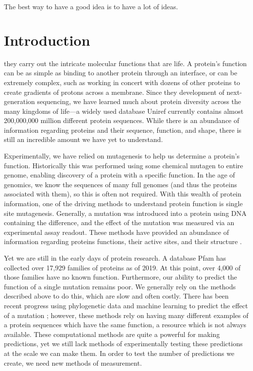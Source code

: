 \begin{savequote}[75mm]
The best way to have a good idea is to have a lot of ideas. 
\end{savequote}

\chapter{Introduction}
\label{introduction}


 they carry out the intricate molecular functions that are life.  A protein's function can be as simple as binding to another protein through an interface\cite{Goldberg1952-lc}, or can be extremely complex, such as working in concert with dozens of other proteins to create gradients of protons across a membrane\cite{Schultz2001-od}. Since they development of next-generation sequencing\cite{Shendure2005-cu,Ronaghi1998-wb,Niedringhaus2011-tn}, we have learned much about protein diversity across the many kingdoms of life---a widely used database Uniref currently contains almost 200,000,000 million different protein sequences\cite{UniProt_Consortium2019-cs}. While there is an abundance of information regarding proteins and their sequence, function, and shape, there is still an incredible amount we have yet to understand.

Experimentally, we have relied on mutagenesis to help us determine a protein's function\cite{Shortle1981-pg,Sobels1975-xg}. Historically this was performed using some chemical mutagen to entire genome, enabling discovery of a protein with a  specific function\cite{Sobels1975-xg}. In the age of genomics, we know the sequences of many full genomes (and thus the proteins associated with them), so this is often not required. With this wealth of protein information, one of the driving methods to understand protein function is single site mutagenesis\cite{Muller1978-oc,Flavell1975-wk,Kunkel1985-hk,Braman2002-wp}. Generally, a mutation was introduced into a protein using DNA containing the difference, and the effect of the mutation was measured via an experimental assay readout. These methods have provided an abundance of information regarding proteins functions, their active sites, and their structure .

Yet we are still in the early days of protein research. A database Pfam  \cite{Finn2014-se} has collected over 17,929 families of proteins as of 2019\cite{El-Gebali2019}. At this point, over 4,000 of those families have no known function. Furthermore, our ability to predict the function of a single mutation remains poor. We generally rely on the methods described above to do this, which are slow and often costly. There has been recent progress using phylogenetic data and machine learning to predict the effect of a mutation \cite{Riesselman2018-gq}; however, these methods rely on having many different examples of a protein sequences which have the same function, a resource which is not always available. These computational methods are quite a powerful for making predictions, yet we still lack methods of experimentally testing these predictions at the scale we can make them. In order to test the number of predictions we create, we need new methods of measurement. 

